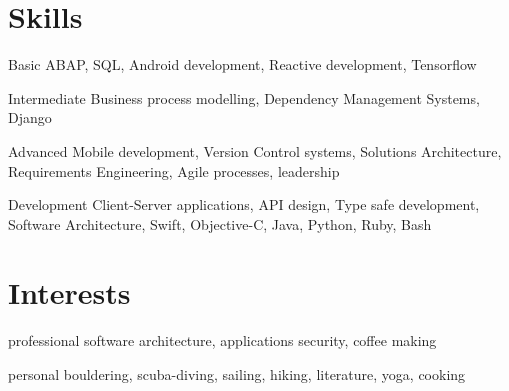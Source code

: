 \documentclass[]{friggeri-cv} %
\begin{document}

\section{Skills}

\begin{entrylist}

	
	\smallentry
	{Basic}
	{ABAP, SQL, Android development, Reactive development, Tensorflow}
	
	
	\smallentry
	{Intermediate}
	{Business process modelling, Dependency Management Systems, Django}
	
	
	\smallentry
	{Advanced}
	{Mobile development, Version Control systems, Solutions Architecture, Requirements Engineering, Agile processes, leadership}
	
	
	\smallentry
	{Development}
	{Client-Server applications, API design, Type safe development, Software Architecture, Swift, Objective-C, Java, Python, Ruby, Bash}


\end{entrylist}


\section{Interests}

\begin{entrylist}
	\smallentry
	{professional}
	{software architecture, applications security, coffee making}

	\smallentry
	{personal}
	{bouldering, scuba-diving, sailing, hiking, literature, yoga, cooking}
	
\end{entrylist}
\end{document}
